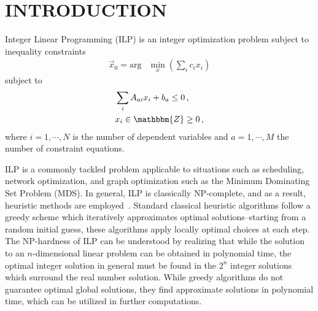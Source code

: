 \documentclass[prd,twocolumn,tightenlines,preprintnumbers,showpacs,superscriptaddress,notitlepage,nofootinbib,eqsecnum,floatfix,longbibliography,aps,10pt]{revtex4-2}
\begin{document}

\maketitle

\flushbottom
\maketitle

\section{INTRODUCTION}
\label{sec:introduction}
Integer Linear Programming (ILP) is an integer optimization problem subject to inequality constraints
\begin{align}
 \label{eq:initial-ip-def}
 \vec x_0 = \mathrm{arg} & \min\limits_{x}\left(\sum_i c_i x_i\right)
\end{align}
subject to
\begin{align}
 \label{eq:ilp-constraints}
  & \sum_i A_{ai}x_i +b_a \leq 0 \,, \\
  & x_i  \in \mathbbm{Z} \geq 0\, ,
\end{align}
where $i=1, \cdots,  N$ is the number of dependent variables and $a=1, \cdots, M$ the number of constraint equations.

ILP is a commonly tackled problem applicable to situations such as scheduling, network optimization, and graph optimization such as the Minimum Dominating Set Problem (MDS).
In general, ILP is classically NP-complete, and as a result, heuristic methods are employed~\cite{GLOVER1986533, doi:10.1287/ijoc.1.3.190, doi:10.1287/ijoc.2.1.4}.
Standard classical heuristic algorithms follow a greedy scheme which iteratively approximates optimal solutions--starting from a random initial guess, these algorithms apply locally optimal choices at each step.
The NP-hardness of ILP can be understood by realizing that while the solution to an $n$-dimensional linear problem can be obtained in polynomial time, the optimal integer solution in general must be found in the $2^n$ integer solutions which surround the real number solution.
While greedy algorithms do not guarantee optimal global solutions, they find approximate solutions in polynomial time, which can be utilized in further computations.
\end{document}
